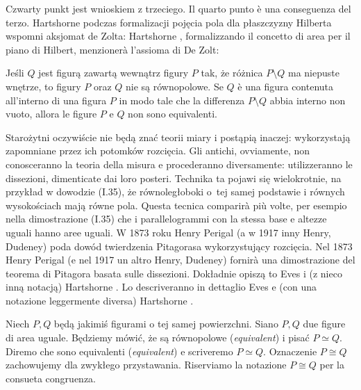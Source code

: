 Czwarty punkt jest wnioskiem z trzeciego. %
Il quarto punto è una conseguenza del terzo. %
Hartshorne \cite[s. 196--204]{hartshorne_2000} podczas formalizacji pojęcia pola dla płaszczyzny Hilberta wspomni aksjomat de Zolta: %
Hartshorne \cite[p. 196--204]{hartshorne_2000}, formalizzando il concetto di area per il piano di Hilbert, menzionerà l'assioma di De Zolt: %

\begin{axiom}
[Z, de Zolta] %
[Z, di De Zolt] %
    Jeśli $Q$ jest figurą zawartą wewnątrz figury $P$ tak, że różnica $P \setminus Q$ ma niepuste wnętrze, to figury $P$ oraz $Q$ nie są równopolowe. %
    Se $Q$ è una figura contenuta all'interno di una figura $P$ in modo tale che la differenza $P \setminus Q$ abbia interno non vuoto, allora le figure $P$ e $Q$ non sono equivalenti. %
\end{axiom}

Starożytni oczywiście nie będą znać teorii miary i postąpią inaczej: wykorzystają zapomniane przez ich potomków rozcięcia. %
Gli antichi, ovviamente, non conosceranno la teoria della misura e procederanno diversamente: utilizzeranno le dissezioni, dimenticate dai loro posteri. %
Technika ta pojawi się wielokrotnie, na przykład w dowodzie (I.35), że równoległoboki o~tej samej podstawie i równych wysokościach mają równe pola. %
Questa tecnica comparirà più volte, per esempio nella dimostrazione (I.35) che i parallelogrammi con la stessa base e altezze uguali hanno aree uguali. %
W 1873 roku Henry Perigal (a w 1917 inny Henry, Dudeney) poda dowód twierdzenia Pitagorasa wykorzystujący rozcięcia. %
Nel 1873 Henry Perigal (e nel 1917 un altro Henry, Dudeney) fornirà una dimostrazione del teorema di Pitagora basata sulle dissezioni. %
%
%
Dokładnie opiszą to Eves \cite[s. 194-239]{eves1_1972} i (z nieco inną notacją) Hartshorne \cite[s. 212-221]{hartshorne_2000}. %
Lo descriveranno in dettaglio Eves \cite[p. 194-239]{eves1_1972} e (con una notazione leggermente diversa) Hartshorne \cite[p. 212-221]{hartshorne_2000}. %

Niech $P, Q$ będą jakimiś figurami o tej samej powierzchni. %
Siano $P, Q$ due figure di area uguale. %
Będziemy mówić, że są równopolowe (\emph{equivalent}) i pisać $P \simeq Q$. %
Diremo che sono equivalenti (\emph{equivalent}) e scriveremo $P \simeq Q$. %
Oznaczenie $P \cong Q$ zachowujemy dla zwykłego przystawania. %
Riserviamo la notazione $P \cong Q$ per la consueta congruenza. %

